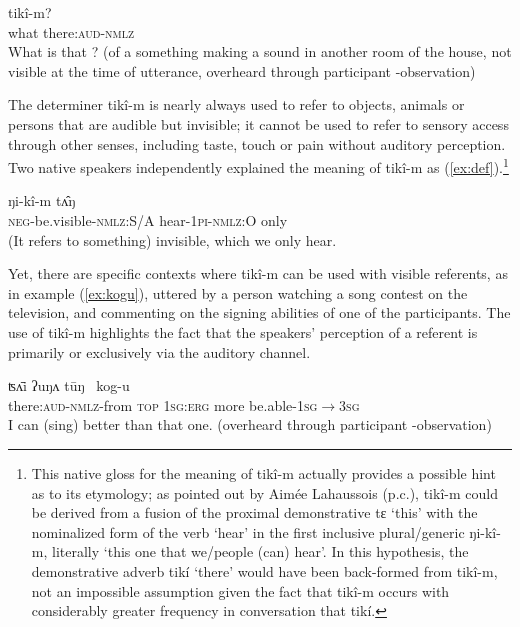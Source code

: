 \documentclass[oneside,a4paper,11pt]{article}
\newcommand{\ipa}[1]{{\phon \mbox{#1}}} %
\begin{document}
\begin{exe}
\ex \label{ex:what}
\gll  	\ipa{mâŋ}  	 	\ipa{tikî-m?}   \\
what  there:\textsc{aud}-\textsc{nmlz} \\
\glt What is that ? (of a something making a sound in another room of the house, not visible at the time of utterance, overheard through participant -observation)
\end{exe}

The determiner \ipa{tikî-m} is nearly always used to refer to objects, animals or persons  that are audible but invisible; it cannot be used to refer to sensory access through other senses, including taste, touch or pain without auditory perception. Two native speakers independently explained the meaning of  \ipa{tikî-m} as (\ref{ex:def}).\footnote{This native gloss for the meaning of \ipa{tikî-m} actually provides a possible hint as to its etymology; as pointed out by Aimée Lahaussois (p.c.), \ipa{tikî-m} could be derived from a fusion of the proximal demonstrative \ipa{tɛ} `this' with the nominalized form of the verb `hear' in the first inclusive plural/generic \ipa{ŋi-kî-m}, literally `this one that we/people (can) hear'. In this hypothesis, the demonstrative adverb \ipa{tikí} `there' would have been back-formed from \ipa{tikî-m}, not an impossible assumption given the fact that  \ipa{tikî-m} occurs with considerably greater frequency in conversation that  \ipa{tikí}. }

\begin{exe}
\ex \label{ex:def}
\gll  	 	 \ipa{mu-toɔç-pɛ,} \ipa{ŋi-kî-m} \ipa{tʌ̂ŋ}   \\
\textsc{neg}-be.visible-\textsc{nmlz:S/A} hear-\textsc{1pi-nmlz:O} only  \\
\glt (It refers to something) invisible, which we only hear.
\end{exe}

Yet, there are specific contexts where \ipa{tikî-m}  can be used with visible referents, as in example  (\ref{ex:kogu}), uttered by a person watching a song contest on the television, and commenting on the signing abilities of one of the participants. The use of \ipa{tikî-m} highlights the  fact that the  speakers' perception of a referent is primarily or exclusively via the auditory channel.

\begin{exe}
\ex \label{ex:kogu}
\gll  	\ipa{tikî-m-kʌ}   	\ipa{ʦʌ̄i} \ipa{ʔuŋʌ} \ipa{tūŋ }   	\ipa{kog-u}   \\
there:\textsc{aud}-\textsc{nmlz}-from \textsc{top} \textsc{1sg:erg} more be.able-\textsc{1sg$\rightarrow$3sg}	  \\
\glt I can (sing) better than that one. (overheard through participant -observation)
\end{exe}
\end{document}
